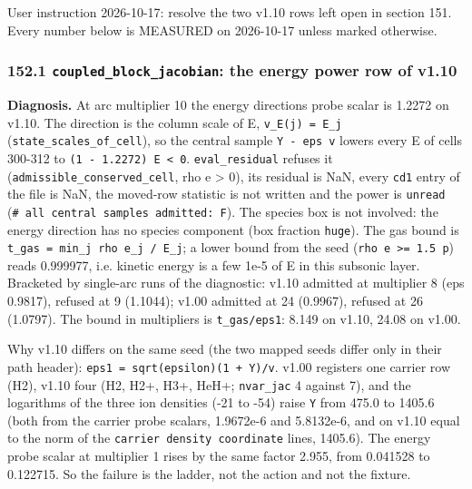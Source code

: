 \documentclass[english,a4paper]{my_memo}
\begin{document}
User instruction 2026-10-17: resolve the two v1.10 rows left open in section 151. Every number below is MEASURED on 2026-10-17 unless marked otherwise.

\subsubsection{\texorpdfstring{152.1 \texttt{coupled\_block\_jacobian}: the energy power row of v1.10}{152.1 coupled\_block\_jacobian: the energy power row of v1.10}}\label{1521-coupled_block_jacobian-the-energy-power-row-of-v110}

\textbf{Diagnosis.} At arc multiplier 10 the energy direction\textquotesingle s probe scalar is 1.2272 on v1.10. The direction is the column scale of E, \texttt{v\_E(j)\ =\ \textbar{}E\_j\textbar{}} (\texttt{state\_scales\_of\_cell}), so the central sample \texttt{Y\ -\ eps\ v} lowers every E of cells 300-312 to \texttt{(1\ -\ 1.2272)\ E\ \textless{}\ 0}. \texttt{eval\_residual} refuses it (\texttt{admissible\_conserved\_cell}, rho e \textgreater{} 0), its residual is NaN, every \texttt{cd1} entry of the file is NaN, the moved-row statistic is not written and the power is \texttt{unread} (\texttt{\#\ all\ central\ samples\ admitted:\ F}). The species box is not involved: the energy direction has no species component (box fraction \texttt{huge}). The gas bound is \texttt{t\_gas\ =\ min\_j\ rho\ e\_j\ /\ E\_j}; a lower bound from the seed (\texttt{rho\ e\ \textgreater{}=\ 1.5\ p}) reads 0.999977, i.e. kinetic energy is a few 1e-5 of E in this subsonic layer. Bracketed by single-arc runs of the diagnostic: v1.10 admitted at multiplier 8 (eps 0.9817), refused at 9 (1.1044); v1.00 admitted at 24 (0.9967), refused at 26 (1.0797). The bound in multipliers is \texttt{t\_gas/eps1}: 8.149 on v1.10, 24.08 on v1.00.

Why v1.10 differs on the same seed (the two mapped seeds differ only in their path header): \texttt{eps1\ =\ sqrt(epsilon)(1\ +\ \textbar{}\textbar{}Y\textbar{}\textbar{})/\textbar{}\textbar{}v\textbar{}\textbar{}}. v1.00 registers one carrier row (H2), v1.10 four (H2, H2+, H3+, HeH+; \texttt{nvar\_jac} 4 against 7), and the logarithms of the three ion densities (-21 to -54) raise \texttt{\textbar{}\textbar{}Y\textbar{}\textbar{}} from 475.0 to 1405.6 (both from the carrier probe scalars, 1.9672e-6 and 5.8132e-6, and on v1.10 equal to the norm of the \texttt{carrier\ density\ coordinate} lines, 1405.6). The energy probe scalar at multiplier 1 rises by the same factor 2.955, from 0.041528 to 0.122715. So the failure is the ladder, not the action and not the fixture.
\end{document}
